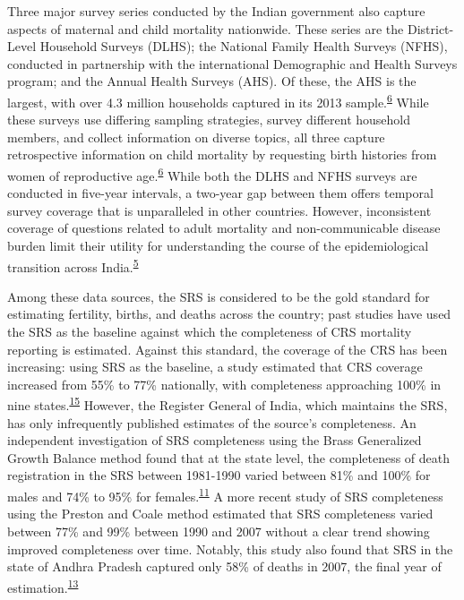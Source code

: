 \documentclass[
]{article}
\begin{document}
Three major survey series conducted by the Indian government also capture aspects of maternal and child mortality nationwide. These series are the District-Level Household Surveys (DLHS); the National Family Health Surveys (NFHS), conducted in partnership with the international Demographic and Health Surveys program; and the Annual Health Surveys (AHS). Of these, the AHS is the largest, with over 4.3 million households captured in its 2013 sample.\textsuperscript{\protect\hyperlink{ref-Dandona2016}{6}} While these surveys use differing sampling strategies, survey different household members, and collect information on diverse topics, all three capture retrospective information on child mortality by requesting birth histories from women of reproductive age.\textsuperscript{\protect\hyperlink{ref-Dandona2016}{6}} While both the DLHS and NFHS surveys are conducted in five-year intervals, a two-year gap between them offers temporal survey coverage that is unparalleled in other countries. However, inconsistent coverage of questions related to adult mortality and non-communicable disease burden limit their utility for understanding the course of the epidemiological transition across India.\textsuperscript{\protect\hyperlink{ref-Yadav2014}{5}}

Among these data sources, the SRS is considered to be the gold standard for estimating fertility, births, and deaths across the country; past studies have used the SRS as the baseline against which the completeness of CRS mortality reporting is estimated. Against this standard, the coverage of the CRS has been increasing: using SRS as the baseline, a study estimated that CRS coverage increased from 55\% to 77\% nationally, with completeness approaching 100\% in nine states.\textsuperscript{\protect\hyperlink{ref-Kumar2019}{15}} However, the Register General of India, which maintains the SRS, has only infrequently published estimates of the source's completeness. An independent investigation of SRS completeness using the Brass Generalized Growth Balance method found that at the state level, the completeness of death registration in the SRS between 1981-1990 varied between 81\% and 100\% for males and 74\% to 95\% for females.\textsuperscript{\protect\hyperlink{ref-Bhat2002}{11}} A more recent study of SRS completeness using the Preston and Coale method estimated that SRS completeness varied between 77\% and 99\% between 1990 and 2007 without a clear trend showing improved completeness over time. Notably, this study also found that SRS in the state of Andhra Pradesh captured only 58\% of deaths in 2007, the final year of estimation.\textsuperscript{\protect\hyperlink{ref-Mahapatra2010}{13}}
\end{document}
